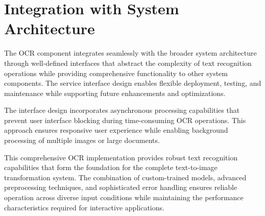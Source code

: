 \section{Integration with System Architecture}

The OCR component integrates seamlessly with the broader system architecture through well-defined interfaces that abstract the complexity of text recognition operations while providing comprehensive functionality to other system components. The service interface design enables flexible deployment, testing, and maintenance while supporting future enhancements and optimizations.

The interface design incorporates asynchronous processing capabilities that prevent user interface blocking during time-consuming OCR operations. This approach ensures responsive user experience while enabling background processing of multiple images or large documents.

This comprehensive OCR implementation provides robust text recognition capabilities that form the foundation for the complete text-to-image transformation system. The combination of custom-trained models, advanced preprocessing techniques, and sophisticated error handling ensures reliable operation across diverse input conditions while maintaining the performance characteristics required for interactive applications.